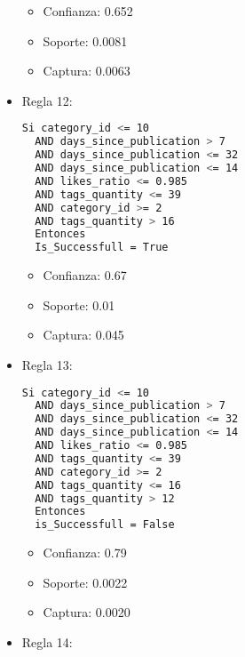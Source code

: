 \begin{itemize}
    \begin{itemize}
      \item Confianza: 0.652
      \item Soporte: 0.0081
      \item Captura: 0.0063
    \end{itemize}

  \item Regla 12:

\begin{lstlisting}[language=bash, numbers=none]
  Si category_id <= 10
  AND days_since_publication > 7
  AND days_since_publication <= 32
  AND days_since_publication <= 14
  AND likes_ratio <= 0.985
  AND tags_quantity <= 39
  AND category_id >= 2
  AND tags_quantity > 16
  Entonces
  Is_Successfull = True
\end{lstlisting}

    \begin{itemize}
      \item Confianza: 0.67
      \item Soporte: 0.01
      \item Captura: 0.045
    \end{itemize}

  \item Regla 13:

\begin{lstlisting}[language=bash, numbers=none]
  Si category_id <= 10
  AND days_since_publication > 7
  AND days_since_publication <= 32
  AND days_since_publication <= 14
  AND likes_ratio <= 0.985
  AND tags_quantity <= 39
  AND category_id >= 2
  AND tags_quantity <= 16
  AND tags_quantity > 12
  Entonces
  is_Successfull = False
\end{lstlisting}

    \begin{itemize}
      \item Confianza: 0.79
      \item Soporte: 0.0022
      \item Captura: 0.0020
    \end{itemize}

  \item Regla 14:


\end{itemize}
